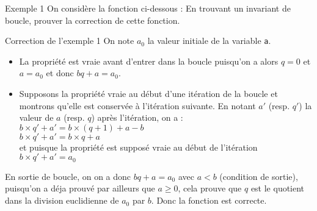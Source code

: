 \documentclass[10pt]{beamer}
\begin{document}
\begin{frame}[fragile]{\Ctitle}{\stitle}
	\begin{exampleblock}{Exemple 1}
		On considère la fonction ci-dessous :
		\onslide<2-> En trouvant un invariant de boucle, prouver la correction de cette fonction.
	\end{exampleblock}
\end{frame}

\begin{frame}[fragile]{\Ctitle}{\stitle}
	\begin{exampleblock}{Correction de l'exemple 1}
		\textcolor{OliveGreen}{On note  $a_0$ la valeur initiale de la variable {\tt a}.}
		\onslide<2->{\textcolor{OliveGreen}{Montrons que la propriété : \\}   \og{} $a_0 = bq + a$ \fg{}  \textcolor{OliveGreen}{est un invariant de boucle.}}
		\begin{itemize}
			\item<4-> \textcolor{OliveGreen}{La propriété est vraie avant d'entrer dans la boucle puisqu'on a alors $q=0$ et $a = a_0$ et donc $bq + a = a_0$.}
			\item<5-> \textcolor{OliveGreen}{Supposons la propriété vraie au début d'une itération de la boucle et montrons qu'elle est conservée à l'itération suivante. En notant $a'$ (resp. $q'$) la valeur de $a$ (resp. $q$) après l'itération, on a : \\
					$b \times q' + a' = b \times (q+1) + a - b$ \\
					$b \times q' + a' = b \times q + a $ \\ et puisque la propriété est supposé vraie au début de l'itération
					$b \times q' + a' = a_0$\\
				}
		\end{itemize}
		\textcolor{OliveGreen}{En sortie de boucle, on on a donc $bq + a = a_0$ avec $a <b$ (condition de sortie), puisqu'on a déja prouvé par ailleurs que $a \geqslant 0$, cela prouve que $q$ est le quotient dans la division euclidienne de $a_0$ par $b$. Donc la fonction est correcte.}
	\end{exampleblock}
\end{frame}
\end{document}
